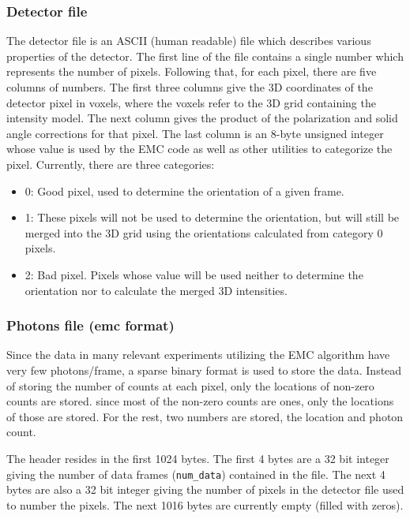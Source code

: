 \documentclass[]{iucr}              %
\begin{document}
\subsubsection{Detector file}
\label{subsec:detector}
The detector file is an ASCII (human readable) file which describes various properties of the detector. The first line of the file contains a single number which represents the number of pixels. Following that, for each pixel, there are five columns of numbers. The first three columns give the 3D coordinates of the detector pixel in voxels, where the voxels refer to the 3D grid containing the intensity model. The next column gives the product of the polarization and solid angle corrections for that pixel. The last column is an 8-byte unsigned integer whose value is used by the EMC code as well as other utilities to categorize the pixel. Currently, there are three categories:
\begin{itemize}
\item 0: Good pixel, used to determine the orientation of a given frame.
\item 1: These pixels will not be used to determine the orientation, but will still be merged into the 3D grid using the orientations calculated from category 0 pixels.
\item 2: Bad pixel. Pixels whose value will be used neither to determine the orientation nor to calculate the merged 3D intensities.
\end{itemize}

\subsubsection{Photons file (emc format)}
\label{subsec:emcformat}
Since the data in many relevant experiments utilizing the EMC algorithm have very few photons/frame, a sparse binary format is used to store the data. Instead of storing the number of counts at each pixel, only the locations of non-zero counts are stored. since most of the non-zero counts are ones, only the locations of those are stored. For the rest, two numbers are stored, the location and photon count. 

The header resides in the first 1024 bytes. The first 4 bytes are a 32 bit integer giving the number of data frames (\texttt{num\_data}) contained in the file. The next 4 bytes are also a 32 bit integer giving the number of pixels in the detector file used to number the pixels. The next 1016 bytes are currently empty (filled with zeros).
\end{document}
